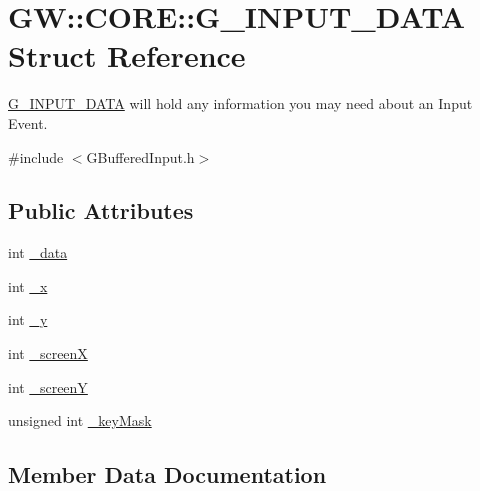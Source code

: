 \hypertarget{struct_g_w_1_1_c_o_r_e_1_1_g___i_n_p_u_t___d_a_t_a}{}\section{GW\+:\+:C\+O\+RE\+:\+:G\+\_\+\+I\+N\+P\+U\+T\+\_\+\+D\+A\+TA Struct Reference}
\label{struct_g_w_1_1_c_o_r_e_1_1_g___i_n_p_u_t___d_a_t_a}


\hyperlink{struct_g_w_1_1_c_o_r_e_1_1_g___i_n_p_u_t___d_a_t_a}{G\+\_\+\+I\+N\+P\+U\+T\+\_\+\+D\+A\+TA} will hold any information you may need about an Input Event.  




{\ttfamily \#include $<$G\+Buffered\+Input.\+h$>$}

\subsection*{Public Attributes}
\begin{DoxyCompactItemize}
\item 
int \hyperlink{struct_g_w_1_1_c_o_r_e_1_1_g___i_n_p_u_t___d_a_t_a_a541bb159142d5b642362627a9b1647c4}{\+\_\+data}
\item 
int \hyperlink{struct_g_w_1_1_c_o_r_e_1_1_g___i_n_p_u_t___d_a_t_a_a9fc513214eaa8c49a48a8e6b71ec7637}{\+\_\+x}
\item 
int \hyperlink{struct_g_w_1_1_c_o_r_e_1_1_g___i_n_p_u_t___d_a_t_a_a1bad4a3cffe34efefab4315f3816938a}{\+\_\+y}
\item 
int \hyperlink{struct_g_w_1_1_c_o_r_e_1_1_g___i_n_p_u_t___d_a_t_a_a2ae44c595636a860b4a4944f5163db1f}{\+\_\+screenX}
\item 
int \hyperlink{struct_g_w_1_1_c_o_r_e_1_1_g___i_n_p_u_t___d_a_t_a_aa8b98f86ea3359af1b6e4bcbb9c5db68}{\+\_\+screenY}
\item 
unsigned int \hyperlink{struct_g_w_1_1_c_o_r_e_1_1_g___i_n_p_u_t___d_a_t_a_afc9223ffbcf79f43b2ef6994a518f326}{\+\_\+key\+Mask}
\end{DoxyCompactItemize}


\subsection{Member Data Documentation}
\hypertarget{struct_g_w_1_1_c_o_r_e_1_1_g___i_n_p_u_t___d_a_t_a_a541bb159142d5b642362627a9b1647c4}{}\label{struct_g_w_1_1_c_o_r_e_1_1_g___i_n_p_u_t___d_a_t_a_a541bb159142d5b642362627a9b1647c4} 
